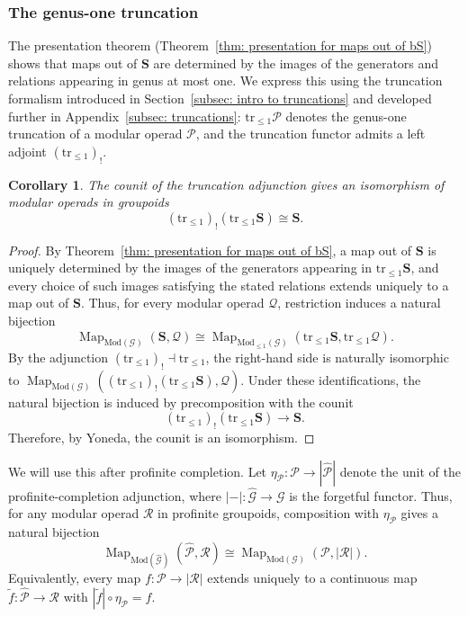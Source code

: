 \documentclass{amsart}
\newcommand{\calQ}{\mathcal{Q}}
\newcommand{\bS}{\mathbf{S}}
\newcommand{\Grpd}{\mathscr{G}}
\newcommand{\calP}{\mathcal{P}}
\newcommand{\Mod}{\mathrm{Mod}}
\newcommand{\Map}{\operatorname{Map}}
\newcommand{\trun}[1]{\mathrm{tr}_{\leq{#1}}}
\newtheorem{cor}[theorem]{Corollary}%
\theoremstyle{definition}
\numberwithin{equation}{section}
\begin{document}
\subsubsection{The genus-one truncation}
The presentation theorem (Theorem~\ref{thm: presentation for maps out of bS}) shows that maps out of $\mathbf S$ are determined by the images of the generators and relations appearing in genus at most one. We express this using the truncation formalism introduced in Section~\ref{subsec: intro to truncations} and developed further in Appendix~\ref{subsec: truncations}: $\trun{1}\calP$ denotes the genus-one truncation of a modular operad $\calP$, and the truncation functor admits a left adjoint $(\trun{1})_!$.

\begin{cor}\label{cor: maps out of bS}
The counit of the truncation adjunction gives an isomorphism of modular operads in groupoids
\[
(\trun{1})_!(\trun{1}\bS)\cong \bS.
\]
\end{cor}

\begin{proof}
By Theorem~\ref{thm: presentation for maps out of bS}, a map out of $\bS$ is uniquely determined by the images of the generators appearing in $\trun{1}\bS$, and every choice of such images satisfying the stated relations extends uniquely to a map out of $\bS$. Thus, for every modular operad $\calQ$, restriction induces a natural bijection
\[
\Map_{\Mod(\Grpd)}(\bS,\calQ) \cong \Map_{\Mod_{\leq 1}(\Grpd)}(\trun{1}\bS,\trun{1}\calQ).
\]
By the adjunction $(\trun{1})_!\dashv \trun{1}$, the right-hand side is naturally isomorphic to $\Map_{\Mod(\Grpd)}((\trun{1})_!(\trun{1}\bS),\calQ).$ Under these identifications, the natural bijection is induced by precomposition with the counit
\[
(\trun{1})_!(\trun{1}\bS)\longrightarrow \bS.
\]
Therefore, by Yoneda, the counit is an isomorphism.
\end{proof}


We will use this after profinite completion.  Let $\eta_{\calP}:\calP\to |\widehat{\calP}|$ denote the unit of the profinite-completion adjunction, where $|-|:\widehat{\Grpd}\to\Grpd$ is the forgetful functor. Thus, for any modular operad $\mathcal R$ in profinite groupoids, composition with $\eta_{\calP}$ gives a natural bijection
\[
\Map_{\Mod(\widehat{\Grpd})}(\widehat{\calP},\mathcal R) \cong \Map_{\Mod(\Grpd)}(\calP,|\mathcal R|).
\]
Equivalently, every map $f:\calP\to|\mathcal R|$ extends uniquely to a continuous map $\widetilde f:\widehat{\calP}\to\mathcal R$ with $|\widetilde f|\circ\eta_{\calP}=f$.
\end{document}
